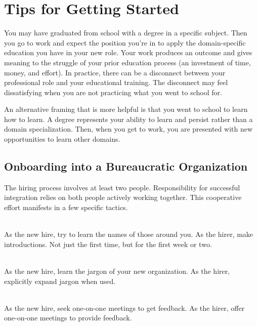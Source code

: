 \section{Tips for Getting Started}

You may have graduated from school with a degree in a specific subject. Then you go to work and expect the position you're in to apply the domain-specific education you have in your new role. Your work produces an outcome and gives meaning to the struggle of your prior education process (an investment of time, money, and effort). In practice, there can be a disconnect between your professional role and your educational training. The disconnect may feel dissatisfying when you are not practicing what you went to school for.

An alternative framing that is more helpful is that you went to school to learn how to learn. A degree represents your ability to learn and persist rather than a domain specialization. Then, when you get to work, you are presented with new opportunities to learn other domains. 

\subsection*{Onboarding into a Bureaucratic Organization}

The hiring process involves at least two people. Responsibility for successful integration relies on both people actively working together. This cooperative effort manifests in a few specific tactics. 

\ \\
As the new hire, try to learn the names of those around you. %
%
%
As the hirer, make introductions. Not just the first time, but for the first week or two.

\ \\
As the new hire, learn the jargon of your new organization. %
As the hirer, explicitly expand jargon when used.

\ \\
As the new hire, seek one-on-one meetings to get feedback. %
As the hirer, offer one-on-one meetings to provide feedback.

